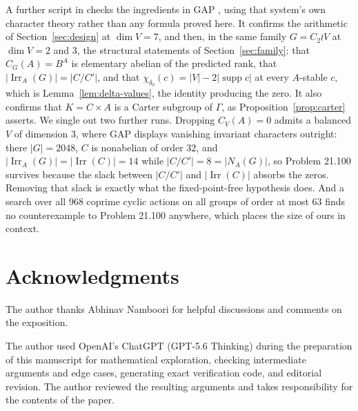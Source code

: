 \documentclass[11pt,a4paper,reqno]{amsart}
\theoremstyle{definition}
\theoremstyle{remark}
\newcommand{\Irr}{\operatorname{Irr}}
\newcommand{\supp}{\operatorname{supp}}
\begin{document}
A further script in \cite{code} checks the ingredients in GAP \cite{gap}, using that
system's own character theory rather than any formula proved here.  It
confirms the arithmetic of Section~\ref{sec:design} at $\dim V=7$, and
then, in the same family $G=C_2\wr V$ at $\dim V=2$ and $3$, the
structural statements of Section~\ref{sec:family}: that $C_G(A)=B^A$ is
elementary abelian of the predicted rank, that
$|\Irr_A(G)|=|C/C'|$, and that
$\chi_{\delta_0}(c)=|V|-2|\supp c|$ at every $A$-stable $c$, which is
Lemma~\ref{lem:delta-values}, the identity producing the zero.  It also
confirms that $K=C\times A$ is a Carter subgroup of $\Gamma$, as
Proposition~\ref{prop:carter} asserts.  We single out two further runs.
Dropping $C_V(A)=0$ admits a balanced $V$ of dimension $3$, where GAP
displays vanishing invariant characters outright: there $|G|=2048$, $C$
is nonabelian of order $32$, and $|\Irr_A(G)|=|\Irr(C)|=14$ while
$|C/C'|=8=|N_A(G)|$, so Problem 21.100 survives because the slack
between $|C/C'|$ and $|\Irr(C)|$ absorbs the zeros.  Removing that slack
is exactly what the fixed-point-free hypothesis does.  And a search over
all $968$ coprime cyclic actions on all groups of order at most $63$
finds no counterexample to Problem 21.100 anywhere, which places the
size of ours in context.

\section*{Acknowledgments}

The author thanks Abhinav Namboori for helpful discussions and comments on the exposition.

The author used OpenAI's ChatGPT (GPT-5.6 Thinking) during the
preparation of this manuscript for mathematical exploration, checking
intermediate arguments and edge cases, generating exact verification
code, and editorial revision.  The author reviewed the resulting
arguments and takes responsibility for the contents of the paper.
\end{document}
